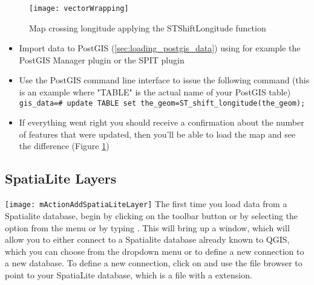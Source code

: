 \begin{figure}[ht]
   \begin{center}
   \caption{Map crossing  longitude applying the ST\textunderscore Shift\textunderscore Longitude function \nixcaption}
\label{fig:vector_wrapping}\smallskip
   \texttt{[image: vectorWrapping]}
\end{center}
\end{figure}


\begin{itemize}
\item Import data to PostGIS (\ref{sec:loading_postgis_data}) using for
example the PostGIS Manager plugin or the SPIT plugin
\item Use the PostGIS command line interface to issue the following command
(this is an example where "TABLE" is the actual name of your PostGIS table) \\ 
\texttt{gis\_data=\# update TABLE set the\_geom=ST\_shift\_longitude(the\_geom);} 
\item If everything went right you should receive a confirmation about the
number of features that were updated, then you'll be able to load the map and
see the difference (Figure \ref{fig:vector_wrapping})
\end{itemize}

\subsection{SpatiaLite Layers} 
\label{label_spatialite} 

\texttt{[image: mActionAddSpatiaLiteLayer]}
The first time you load data from a Spatialite database, begin by clicking on the 
 toolbar button or by selecting the 
option from the  menu or by typing . 
This will bring up a window, which will allow you to either connect to a Spatialite database already known to QGIS, which 
you can choose from the dropdown menu or to define a new connection to a new database. To define a new connection, 
click on  and use the file browser to point to your SpatiaLite database, 
which is a file with a  extension.

